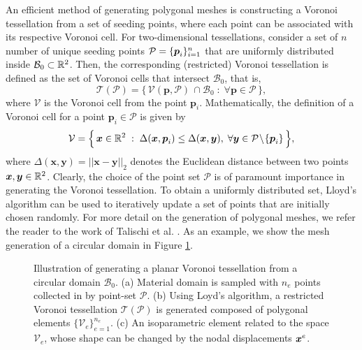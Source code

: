 An efficient method of generating polygonal meshes is constructing a Voronoi tessellation from a set of seeding points, where each point can be associated with its respective Voronoi cell. For two-dimensional tessellations, consider a set of $n$ number of unique seeding points $\mathcal{P} = \{ {\boldsymbol{p}}_i \}^n_{i = 1}$ that are uniformly distributed inside $\mathcal{B}_0 \subset \mathbb{R}^2$. Then, the corresponding (restricted) Voronoi tessellation is defined as the set of Voronoi cells that intersect $\mathcal{B}_0$, that is, 
%
\begin{equation}
\mathcal{T}(\mathcal{P}) = \Big\{\, \mathcal{V}(\boldsymbol{p},\mathcal{P}) \,\cap \mathcal{B}_0 \;:\; \forall \boldsymbol{p} \in \mathcal{P} \,\Big\},
\end{equation}
%
where $\mathcal{V}$ is the Voronoi cell from the point $\boldsymbol{p}_i$. Mathematically, the definition of a Voronoi cell for a point $\boldsymbol{p}_i \in \mathcal{P}$ is given by
%
\begin{equation}
\mathcal{V} = \Big\{\, \boldsymbol{x}\in \mathbb{R}^2 \;:\; \Delta(\boldsymbol{x},\boldsymbol{p}_i) \le \Delta(\boldsymbol{x},\boldsymbol{y}),\; \forall \boldsymbol{y} \in \mathcal{P}\!\setminus\!\{\boldsymbol{p}_i\}  \,\Big\}, \label{eq:vorcell}
\end{equation}
%
where $\Delta(\boldsymbol{x},\boldsymbol{y}) = ||\boldsymbol{x} -  \boldsymbol{y}||_2$ denotes the Euclidean distance between two points $\boldsymbol{x},\boldsymbol{y}\in \mathbb{R}^2$. Clearly, the choice of the point set $\mathcal{P}$ is of paramount importance in generating the Voronoi tessellation. To obtain a uniformly distributed set, Lloyd's algorithm can be used to iteratively update a set of points that are initially chosen randomly. For more detail on the generation of polygonal meshes, we refer the reader to the work of Talischi et al. \cite{Talischi2012}. As an example, we show the mesh generation of a circular domain in Figure \ref{fig:C3:voronoimeshExample}.  
%
\begin{figure}
\centering
\vspace{-2mm}

\caption{Illustration of generating a planar Voronoi tessellation from a circular domain $\mathcal{B}_0$. (a) Material domain is sampled with $n_e$ points collected in by point-set $\mathcal{P}$. (b) Using Loyd's algorithm, a restricted Voronoi tessellation $\mathcal{T}(\mathcal{P})$ is generated composed of polygonal elements $\{\mathcal{V}_e\}_{e=1}^{n_e}$. (c) An isoparametric element related to the space $\mathcal{V}_e$, whose shape can be changed by the nodal displacements ${\boldsymbol{x}}^{e}$. \label{fig:C3:voronoimeshExample}}
\vspace{-3mm}
\end{figure}
